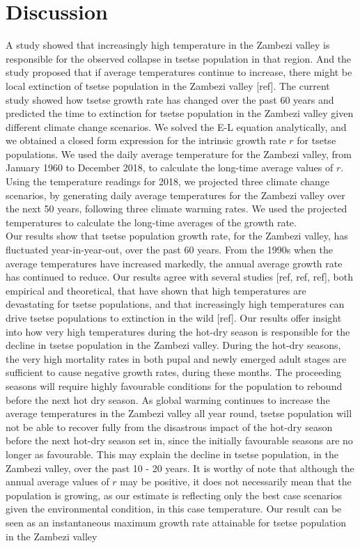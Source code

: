 \documentclass[10pt,a4paper]{article}
\begin{document}
\section*{Discussion}

A study showed that increasingly high temperature in the Zambezi valley is responsible for the observed collapse in tsetse population in that region. And the study proposed that if average temperatures continue to increase, there might be local extinction of tsetse population in the Zambezi valley [ref].  The current study showed how tsetse growth rate has changed over the past 60 years and predicted the time to extinction for tsetse population in the Zambezi valley given different climate change scenarios.  We solved the E-L equation analytically, and we obtained a closed form expression for the intrinsic growth rate $r$ for tsetse populations. We used the daily average temperature for the Zambezi valley, from January 1960 to December 2018, to calculate the long-time average values of $r$. Using the temperature readings for 2018, we projected three climate change scenarios, by generating daily average temperatures for the Zambezi valley over the next 50 years, following three climate warming rates. We used the projected temperatures to calculate the long-time averages of the growth rate.    \\

Our results show that tsetse population growth rate, for the Zambezi valley, has fluctuated year-in-year-out,  over the past 60 years. From the 1990s when the average temperatures have increased markedly, the annual average growth rate has continued to reduce.  Our results agree with several studies [ref, ref, ref], both empirical and theoretical, that have shown that high temperatures are devastating for tsetse populations, and that increasingly high temperatures can drive tsetse populations to extinction in the wild [ref]. Our results offer insight into how very high temperatures during the hot-dry season is responsible for the decline in tsetse population in the Zambezi valley. During the hot-dry seasons, the very high mortality rates in both pupal and newly emerged adult stages are sufficient to cause negative growth rates, during these months. The proceeding seasons will require highly favourable conditions for the population to rebound before the next hot dry season.  As global warming continues to increase the average temperatures in the Zambezi valley all year round, tsetse population will not be able to recover fully from the disastrous impact of the hot-dry season before the next hot-dry season set in, since the initially favourable seasons are no longer as favourable. This may explain the decline in tsetse population, in the Zambezi valley, over the past 10 - 20 years. It is worthy of note that although the annual average values of $r$ may be positive, it does not necessarily mean that the population is growing, as our estimate is reflecting only the best case scenarios given the environmental condition, in this case temperature. Our result can be seen as an instantaneous  maximum growth rate attainable for tsetse population in the Zambezi valley \\
\end{document}
